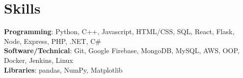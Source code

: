 \documentclass[letterpaper,11pt]{article}
\begin{document}
\section{Skills}
 \begin{itemize}[leftmargin=0.15in, label={}]
    \small{\item{
     \textbf{Programming}{: Python, C++, Javascript, HTML/CSS, SQL, React, Flask, Node, Express, PHP, .NET, C\#} \\
     \textbf{Software/Technical}{: Git, Google Firebase, MongoDB, MySQL, AWS, OOP, Docker, Jenkins, Linux} \\
     \textbf{Libraries}{: pandas, NumPy, Matplotlib}
    }}
 \end{itemize}
%



\end{document}
